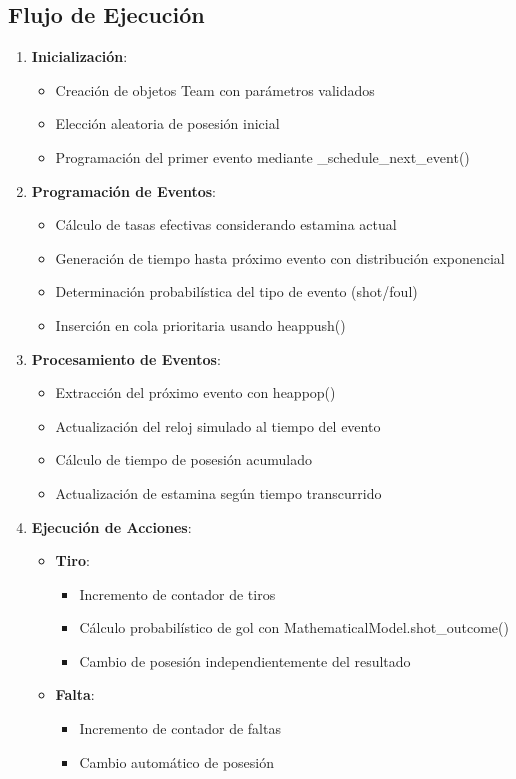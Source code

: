 \documentclass{article}
\begin{document}
\subsection{Flujo de Ejecución}
\begin{enumerate}
    \item \textbf{Inicialización}:
    \begin{itemize}
        \item Creación de objetos Team con parámetros validados
        \item Elección aleatoria de posesión inicial
        \item Programación del primer evento mediante \_schedule\_next\_event()
    \end{itemize}
    
    \item \textbf{Programación de Eventos}:
    \begin{itemize}
        \item Cálculo de tasas efectivas considerando estamina actual
        \item Generación de tiempo hasta próximo evento con distribución exponencial
        \item Determinación probabilística del tipo de evento (shot/foul)
        \item Inserción en cola prioritaria usando heappush()
    \end{itemize}
    
    \item \textbf{Procesamiento de Eventos}:
    \begin{itemize}
        \item Extracción del próximo evento con heappop()
        \item Actualización del reloj simulado al tiempo del evento
        \item Cálculo de tiempo de posesión acumulado
        \item Actualización de estamina según tiempo transcurrido
    \end{itemize}
    
    \item \textbf{Ejecución de Acciones}:
    \begin{itemize}
        \item \textbf{Tiro}:
        \begin{itemize}
            \item Incremento de contador de tiros
            \item Cálculo probabilístico de gol con MathematicalModel.shot\_outcome()
            \item Cambio de posesión independientemente del resultado
        \end{itemize}
        \item \textbf{Falta}:
        \begin{itemize}
            \item Incremento de contador de faltas
            \item Cambio automático de posesión
        \end{itemize}
    \end{itemize}
    

\end{enumerate}
\end{document}
